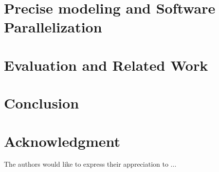 \documentclass [a4paper,final,conference,10pt]{IDAACS}
\begin{document}

\section{Precise modeling and Software Parallelization}
\label{sec:impl}



\section{Evaluation and Related Work}
\label{sec:eval}

\section{Conclusion}
\label{sec:concl}

\section*{Acknowledgment}
The authors would like to express their appreciation to ...
\enlargethispage{-7in}



\end{document}
